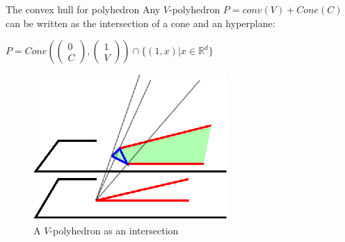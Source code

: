\begin{frame}{The convex hull for polyhedron}
Any $V$-polyhedron $P=conv(V)+Cone(C)$ can be written as the intersection of a cone and an hyperplane:

$P=Cone\left(
 \begin{pmatrix}
 0 \\
 C 
 \end{pmatrix},
 \begin{pmatrix}
 1 \\
 V 
 \end{pmatrix}\right) \cap \{(1,x)|x\in\mathbb{R}^d\}$
 
 \vspace*{-0.7cm}
 
\begin{figure}
\includegraphics[scale=1.5]{images/projection.eps}
\caption{A $V$-polyhedron as an intersection}
\end{figure}
\end{frame}
